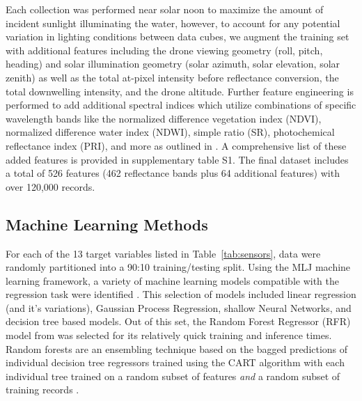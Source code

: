 \documentclass[sensors,article,submit,pdftex,moreauthors]{Definitions/mdpi}
\begin{document}
Each collection was performed near solar noon to maximize the amount of incident sunlight illuminating the water, however, to account for any potential variation in lighting conditions between data cubes, we augment the training set with additional features including the drone viewing geometry (roll, pitch, heading) and solar illumination geometry (solar azimuth, solar elevation, solar zenith) as well as the total at-pixel intensity before reflectance conversion, the total downwelling intensity, and the drone altitude. Further feature engineering is performed to add additional spectral indices which utilize combinations of specific wavelength bands like the normalized difference vegetation index (NDVI), normalized difference water index (NDWI), simple ratio (SR), photochemical reflectance index (PRI), and more as outlined in \cite{envi_vegetation_indices, thenkabail2018hyperspectral,kaufman1992atmospherically, SpectralIndexWheat}. A comprehensive list of these added features is provided in supplementary table S1. The final dataset includes a total of 526 features (462 reflectance bands plus 64 additional features) with over 120,000 records. 

\subsection{Machine Learning Methods}

For each of the 13 target variables listed in Table~\ref{tab:sensors}, data were randomly partitioned into a 90:10 training/testing split. Using the MLJ machine learning framework, a variety of machine learning models compatible with the regression task were identified \cite{MLJ1}. This selection of models included linear regression (and it's variations), Gaussian Process Regression, shallow Neural Networks, and decision tree based models. Out of this set, the Random Forest Regressor (RFR) model from \cite{decision-trees} was selected for its relatively quick training and inference times. Random forests are an ensembling technique based on the bagged predictions of individual decision tree regressors trained using the CART algorithm with each individual tree trained on a random subset of features \textit{and} a random subset of training records \cite{decision-trees, random-forest}.
\end{document}
